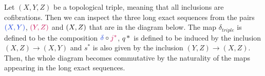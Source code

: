 \begin{corollary} \label{ktheo:cor-tripleSequence}
	

	Let $(X,Y,Z)$ be a topological triple, meaning that all inclusions are cofibrations. Then we can inspect the three long exact sequences from the pairs $\textcolor{cXY}{(X,Y)}$, $\textcolor{cYZ}{(Y,Z)}$ and $\textcolor{cXZ}{(X,Z)}$ that are in the diagram below. The map $\delta_{triple}$ is defined to be the composition $\textcolor{cXY}{\delta}\circ \textcolor{cYZ}{j^*}$, $q*$ is defined to be induced by the inclusion $(X,Z)\to (X,Y)$ and $s^*$ is also given by the inclusion $(Y,Z)\to (X,Z)$. Then, the whole diagram becomes commutative by the naturality of the maps appearing in the long exact sequences. 

\begin{center}


\end{center}
\end{corollary}
